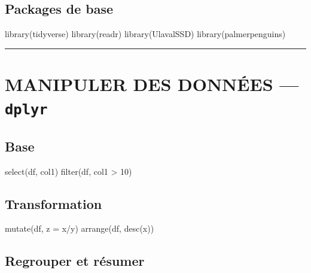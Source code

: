 \documentclass[
  8pt,
  letterpaper,
  DIV=11,
  numbers=noendperiod]{scrartcl}
\newenvironment{Shaded}{\begin{snugshade}}{\end{snugshade}}
\newcommand{\AttributeTok}[1]{\textcolor[rgb]{0.40,0.45,0.13}{#1}}
\newcommand{\DecValTok}[1]{\textcolor[rgb]{0.68,0.00,0.00}{#1}}
\newcommand{\FunctionTok}[1]{\textcolor[rgb]{0.28,0.35,0.67}{#1}}
\newcommand{\NormalTok}[1]{\textcolor[rgb]{0.00,0.23,0.31}{#1}}
\newcommand{\SpecialCharTok}[1]{\textcolor[rgb]{0.37,0.37,0.37}{#1}}
\begin{document}
\subsection{Packages de base}\label{packages-de-base}

\begin{Shaded}
\begin{Highlighting}[]
\FunctionTok{library}\NormalTok{(tidyverse)}
\FunctionTok{library}\NormalTok{(readr)}
\FunctionTok{library}\NormalTok{(UlavalSSD)}
\FunctionTok{library}\NormalTok{(palmerpenguins)}
\end{Highlighting}
\end{Shaded}

\begin{center}\rule{0.5\linewidth}{0.5pt}\end{center}

\section{\texorpdfstring{MANIPULER DES DONNÉES ---
\texttt{dplyr}}{MANIPULER DES DONNÉES --- dplyr}}\label{manipuler-des-donnuxe9es-dplyr}

\subsection{Base}\label{base}

\begin{Shaded}
\begin{Highlighting}[]
\FunctionTok{select}\NormalTok{(df, col1)}
\FunctionTok{filter}\NormalTok{(df, col1 }\SpecialCharTok{\textgreater{}} \DecValTok{10}\NormalTok{)}
\end{Highlighting}
\end{Shaded}

\subsection{Transformation}\label{transformation}

\begin{Shaded}
\begin{Highlighting}[]
\FunctionTok{mutate}\NormalTok{(df, }\AttributeTok{z =}\NormalTok{ x}\SpecialCharTok{/}\NormalTok{y)}
\FunctionTok{arrange}\NormalTok{(df, }\FunctionTok{desc}\NormalTok{(x))}
\end{Highlighting}
\end{Shaded}

\subsection{Regrouper et résumer}\label{regrouper-et-ruxe9sumer}
\end{document}
